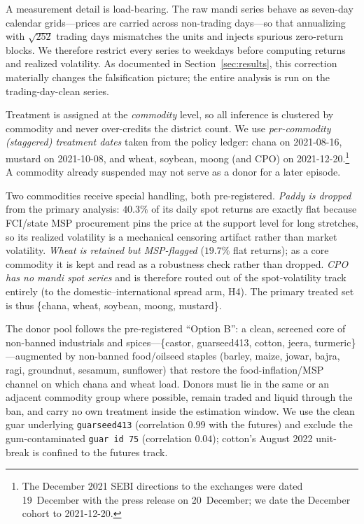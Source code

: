 A measurement detail is load-bearing. The raw mandi series behave as seven-day
calendar grids---prices are carried across non-trading days---so that annualizing with
$\sqrt{252}$ trading days mismatches the units and injects spurious zero-return blocks.
We therefore restrict every series to weekdays before computing returns and realized
volatility. As documented in Section~\ref{sec:results}, this correction materially
changes the falsification picture; the entire analysis is run on the trading-day-clean
series.

Treatment is assigned at the \emph{commodity} level, so all inference is clustered by
commodity and never over-credits the district count. We use \emph{per-commodity
(staggered) treatment dates} taken from the policy ledger: chana on 2021-08-16,
mustard on 2021-10-08, and wheat, soybean, moong (and CPO) on 2021-12-20.\footnote{The
December 2021 SEBI directions to the exchanges were dated 19~December with the press
release on 20~December; we date the December cohort to 2021-12-20.} A commodity already
suspended may not serve as a donor for a later episode.

Two commodities receive special handling, both pre-registered. \emph{Paddy is dropped}
from the primary analysis: $40.3\%$ of its daily spot returns are exactly flat because
FCI/state MSP procurement pins the price at the support level for long stretches, so its
realized volatility is a mechanical censoring artifact rather than market volatility.
\emph{Wheat is retained but MSP-flagged} ($19.7\%$ flat returns); as a core commodity it
is kept and read as a robustness check rather than dropped. \emph{CPO has no mandi spot
series} and is therefore routed out of the spot-volatility track entirely (to the
domestic--international spread arm, H4). The primary treated set is thus
\{chana, wheat, soybean, moong, mustard\}.

The donor pool follows the pre-registered ``Option B'': a clean, screened core of
non-banned industrials and spices---\{castor, guarseed413, cotton, jeera, turmeric\}---augmented
by non-banned food/oilseed staples (barley, maize, jowar, bajra, ragi, groundnut,
sesamum, sunflower) that restore the food-inflation/MSP channel on which chana and
wheat load. Donors must lie in the same or an adjacent commodity group where possible,
remain traded and liquid through the ban, and carry no own treatment inside the
estimation window. We use the clean guar underlying \texttt{guarseed413} (correlation
$0.99$ with the futures) and exclude the gum-contaminated \texttt{guar id~75}
(correlation $0.04$); cotton's August 2022 unit-break is confined to the futures track.

